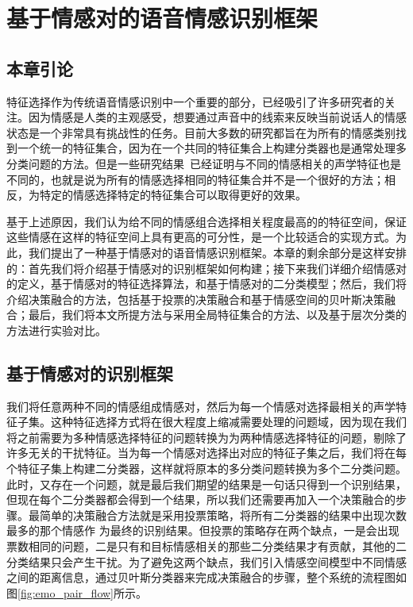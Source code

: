 \chapter{基于情感对的语音情感识别框架}
\label{cha:emo_pair_base_framework}

\section{本章引论}
\label{sec:emo_pair_base_framework_intro}
特征选择作为传统语音情感识别中一个重要的部分，已经吸引了许多研究者的关注。因为情感是人类的主观感受，想要通过声音中的线索来反映当前说话人的情感状态是一个非常具有挑战性的任务。目前大多数的研究都旨在为所有的情感类别找到一个统一的特征集合，因为在一个共同的特征集合上构建分类器也是通常处理多分类问题的方法。但是一些研究结果~\cite{Lee2009Emotion}已经证明与不同的情感相关的声学特征也是不同的，也就是说为所有的情感选择相同的特征集合并不是一个很好的方法；相反，为特定的情感选择特定的特征集合可以取得更好的效果。

基于上述原因，我们认为给不同的情感组合选择相关程度最高的的特征空间，保证这些情感在这样的特征空间上具有更高的可分性，是一个比较适合的实现方式。为此，我们提出了一种基于情感对的语音情感识别框架。本章的剩余部分是这样安排的：首先我们将介绍基于情感对的识别框架如何构建；接下来我们详细介绍情感对的定义，基于情感对的特征选择算法，和基于情感对的二分类模型；然后，我们将介绍决策融合的方法，包括基于投票的决策融合和基于情感空间的贝叶斯决策融合；最后，我们将本文所提方法与采用全局特征集合的方法、以及基于层次分类的方法进行实验对比。

\section{基于情感对的识别框架}
\label{sec:emo_pair_base_framework}
我们将任意两种不同的情感组成情感对，然后为每一个情感对选择最相关的声学特征子集。这种特征选择方式将在很大程度上缩减需要处理的问题域，因为现在我们将之前需要为多种情感选择特征的问题转换为为两种情感选择特征的问题，剔除了许多无关的干扰特征。当为每一个情感对选择出对应的特征子集之后，我们将在每个特征子集上构建二分类器，这样就将原本的多分类问题转换为多个二分类问题。此时，又存在一个问题，就是最后我们期望的结果是一句话只得到一个识别结果，但现在每个二分类器都会得到一个结果，所以我们还需要再加入一个决策融合的步骤。最简单的决策融合方法就是采用投票策略，将所有二分类器的结果中出现次数最多的那个情感作  为最终的识别结果。但投票的策略存在两个缺点，一是会出现票数相同的问题，二是只有和目标情感相关的那些二分类结果才有贡献，其他的二分类结果只会产生干扰。为了避免这两个缺点，我们引入情感空间模型中不同情感之间的距离信息，通过贝叶斯分类器来完成决策融合的步骤，整个系统的流程图如图\ref{fig:emo_pair_flow}所示。

